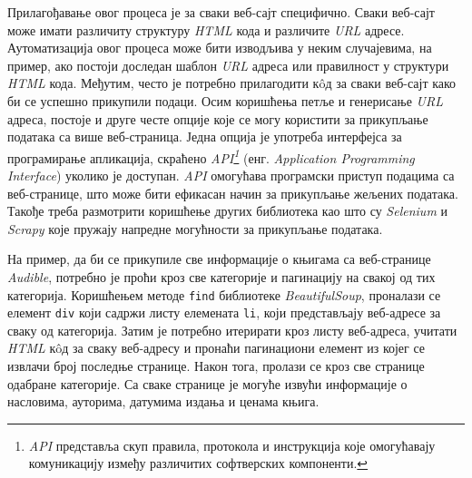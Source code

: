 \documentclass[12pt,oneside]{memoir}
\begin{document}
Прилагођавање овог процеса је за сваки веб-сајт специфично. Сваки веб-сајт може имати различиту структуру \textit{HTML} кода и различите \textit{URL} адресе. Аутоматизација овог процеса може бити изводљива у неким случајевима, на пример, ако постоји доследан шаблон \textit{URL} адреса или правилност у структури \textit{HTML} кода. Међутим, често је потребно прилагодити кôд за сваки веб-сајт како би се успешно прикупили подаци. Осим коришћења петље и генерисање \textit{URL} адреса, постоје и друге честе опције које се могу користити за прикупљање података са више веб-страница. Једна опција је употреба интерфејса за програмирање апликација, скраћено \emph{API\footnote{\textit{API} представља скуп правила, протокола и инструкција које омогућавају комуникацију између различитих софтверских компоненти.}} (енг. \textit{Application Programming Interface}) уколико је доступан. \textit{API} омогућава програмски приступ подацима са веб-странице, што може бити ефикасан начин за прикупљање жељених података. Такође треба размотрити коришћење других библиотека као што су \textit{Selenium} и \textit{Scrapy} које пружају напредне могућности за прикупљање података.

На пример, да би се прикупиле све информације о књигама са веб-странице \textit{Audible}, потребно је проћи кроз све категорије и пагинацију на свакој од тих категорија. Коришћењем методе \texttt{find} библиотеке \textit{BeautifulSoup}, проналази се елемент \texttt{div} који садржи листу елемената \texttt{li}, који представљају веб-адресе за сваку од категорија. Затим је потребно итерирати кроз листу веб-адреса, учитати \textit{HTML} кôд за сваку веб-адресу и пронаћи пагинациони елемент из којег се извлачи број последње странице. Након тога, пролази се кроз све странице одабране категорије. Са сваке странице је могуће извући информације о насловима, ауторима, датумима издања и ценама књига. 
\end{document}
